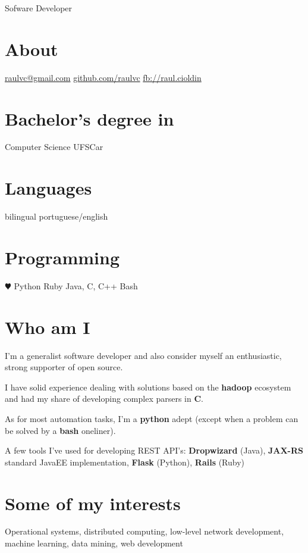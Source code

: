 \documentclass[]{friggeri-cv}
\begin{document}
       {Sofware Developer}


\begin{aside}
  \section{About}        
    \href{mailto:raulvc@gmail.com}{raulvc@gmail.com}
    \href{https://github.com/raulvc}{github.com/raulvc}
    \href{https://www.facebook.com/raul.cioldin}{fb://raul.cioldin}
  \section{Bachelor's degree in}
	Computer Science
	UFSCar
  \section{Languages}
    bilingual portuguese/english
  \section{Programming}
    {\color{red} $\varheartsuit$} Python
    Ruby
	Java, C, C++
	Bash
\end{aside}

\section{Who am I}

I'm a generalist software developer and also consider myself an enthusiastic, strong supporter of open source.

I have solid experience dealing with solutions based on the \textbf{hadoop} ecosystem and had my share of developing complex parsers in \textbf{C}. 

As for most automation tasks, I'm a \textbf{python} adept (except when a problem can be solved by a \textbf{bash} oneliner).

A few tools I've used for developing REST API's: \textbf{Dropwizard} (Java), \textbf{JAX-RS} standard JavaEE implementation, \textbf{Flask} (Python), \textbf{Rails} (Ruby)

\section{Some of my interests}

Operational systems, distributed computing, low-level network development, machine learning, data mining, web development
\end{document}
